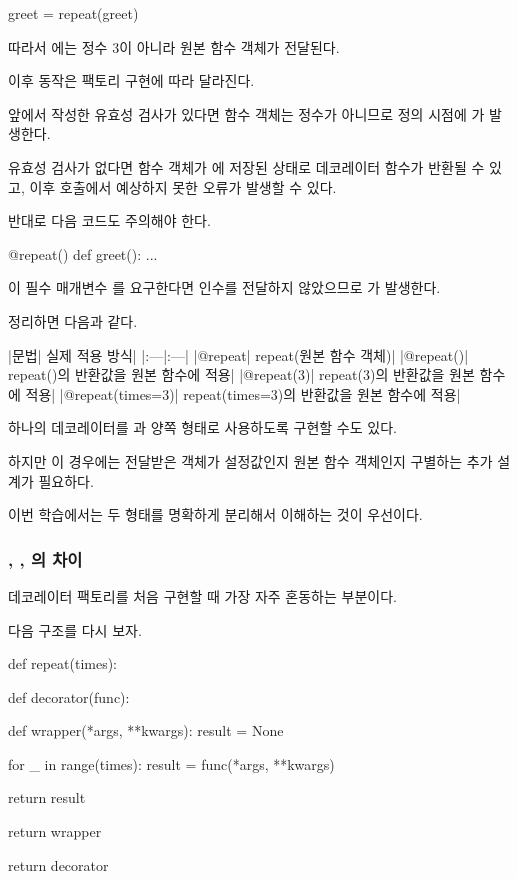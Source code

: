\begin{dhkcode}
greet = repeat(greet)
\end{dhkcode}

따라서 에는 정수 3이 아니라 원본  함수 객체가 전달된다.

이후 동작은 팩토리 구현에 따라 달라진다.

앞에서 작성한 유효성 검사가 있다면 함수 객체는 정수가 아니므로 정의 시점에
가 발생한다.

유효성 검사가 없다면 함수 객체가 에 저장된 상태로 데코레이터 함수가 반환될 수 있고, 이후 호출에서 예상하지 못한 오류가 발생할 수 있다.

반대로 다음 코드도 주의해야 한다.

\begin{dhkcode}
@repeat()
def greet():
    ...
\end{dhkcode}

이 필수 매개변수 를 요구한다면 인수를 전달하지 않았으므로 가 발생한다.

정리하면 다음과 같다.

\begin{dhktable}
|문법|	실제 적용 방식|
|:---|:---|
|@repeat|	repeat(원본 함수 객체)|
|@repeat()|	repeat()의 반환값을 원본 함수에 적용|
|@repeat(3)|	repeat(3)의 반환값을 원본 함수에 적용|
|@repeat(times=3)|	repeat(times=3)의 반환값을 원본 함수에 적용|
\end{dhktable}

하나의 데코레이터를 과  양쪽 형태로 사용하도록 구현할 수도 있다.

하지만 이 경우에는 전달받은 객체가 설정값인지 원본 함수 객체인지 구별하는 추가 설계가 필요하다.

이번 학습에서는 두 형태를 명확하게 분리해서 이해하는 것이 우선이다.

\subsubsection{, , 의 차이}

데코레이터 팩토리를 처음 구현할 때 가장 자주 혼동하는 부분이다.

다음 구조를 다시 보자.

\begin{dhkcode}
def repeat(times):

    def decorator(func):

        def wrapper(*args, **kwargs):
            result = None

            for _ in range(times):
                result = func(*args, **kwargs)

            return result

        return wrapper

    return decorator
\end{dhkcode}

